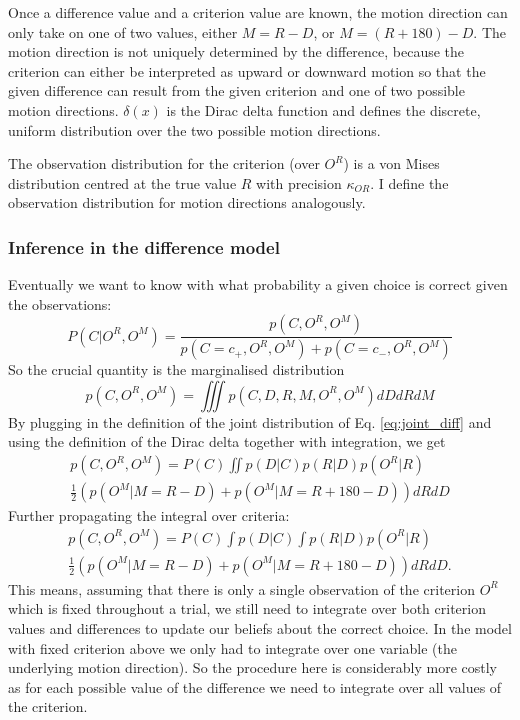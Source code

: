 \documentclass[10pt,a4paper]{article}
\begin{document}
Once a difference value and a criterion value are known, the motion direction can only take on one of two values, either $M = R - D$, or $M = (R + 180) - D$. The motion direction is not uniquely determined by the difference, because the criterion can either be interpreted as upward or downward motion so that the given difference can result from the given criterion and one of two possible motion directions. $\delta(x)$ is the Dirac delta function and defines the discrete, uniform distribution over the two possible motion directions. 

The observation distribution for the criterion (over $O^R$) is a von Mises distribution centred at the true value $R$ with precision $\kappa_{OR}$. I define the observation distribution for motion directions analogously.

\subsubsection{Inference in the difference model}
Eventually we want to know with what probability a given choice is correct given the observations:
\begin{equation}\label{eq:post_diff}
P(C | O^R, O^M) = \frac{p(C, O^R, O^M)}{p(C=c_+, O^R, O^M) + p(C=c_-, O^R, O^M)}
\end{equation}
So the crucial quantity is the marginalised distribution
\begin{equation}
p(C, O^R, O^M) = \iiint p(C, D, R, M, O^R, O^M) dD dR dM
\end{equation}
By plugging in the definition of the joint distribution of Eq. \eqref{eq:joint_diff} and using the definition of the Dirac delta together with integration, we get
\begin{multline}
p(C, O^R, O^M) = P(C) \iint p(D | C) p(R | D) p(O^R | R)\\ 
\frac{1}{2}\left(p(O^M | M = R - D) + p(O^M | M = R + 180 - D)\right) dR dD
\end{multline}
Further propagating the integral over criteria:
\begin{multline}
p(C, O^R, O^M) = P(C) \int p(D | C) \int p(R | D)p(O^R | R)\\
\frac{1}{2}\left(p(O^M | M = R - D) + p(O^M | M = R + 180 - D)\right) dR dD.
\end{multline}
This means, assuming that there is only a single observation of the criterion $O^R$ which is fixed throughout a trial, we still need to integrate over both criterion values and differences to update our beliefs about the correct choice. In the model with fixed criterion above we only had to integrate over one variable (the underlying motion direction). So the procedure here is considerably more costly as for each possible value of the difference we need to integrate over all values of the criterion.
\end{document}

